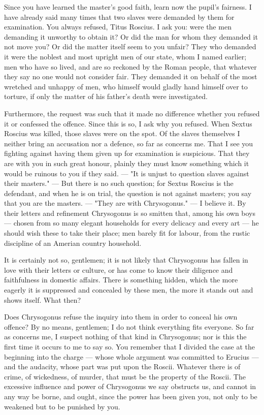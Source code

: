 Since you have learned the master's good faith, learn now the pupil's fairness. I have already said many times that two slaves were demanded by them for examination. You always refused, Titus Roscius. I ask you: were the men demanding it unworthy to obtain it? Or did the man for whom they demanded it not move you? Or did the matter itself seem to you unfair? They who demanded it were the noblest and most upright men of our state, whom I named earlier; men who have so lived, and are so reckoned by the Roman people, that whatever they say no one would not consider fair. They demanded it on behalf of the most wretched and unhappy of men, who himself would gladly hand himself over to torture, if only the matter of his father's death were investigated.

 Furthermore, the request was such that it made no difference whether you refused it or confessed the offence. Since this is so, I ask why you refused. When Sextus Roscius was killed, those slaves were on the spot. Of the slaves themselves I neither bring an accusation nor a defence, so far as concerns me. That I see you fighting against having them given up for examination is suspicious. That they are with you in such great honour, plainly they must know something which it would be ruinous to you if they said. --- "It is unjust to question slaves against their masters." --- But there is no such question; for Sextus Roscius is the defendant, and when he is on trial, the question is not against masters; you say that you are the masters. --- "They are with Chrysogonus." --- I believe it. By their letters and refinement Chrysogonus is so smitten that, among his own boys --- chosen from so many elegant households for every delicacy and every art --- he should wish these to take their place; men barely fit for labour, from the rustic discipline of an Amerian country household.

 It is certainly not so, gentlemen; it is not likely that Chrysogonus has fallen in love with their letters or culture, or has come to know their diligence and faithfulness in domestic affairs. There is something hidden, which the more eagerly it is suppressed and concealed by these men, the more it stands out and shows itself. What then?

 Does Chrysogonus refuse the inquiry into them in order to conceal his own offence? By no means, gentlemen; I do not think everything fits everyone. So far as concerns me, I suspect nothing of that kind in Chrysogonus; nor is this the first time it occurs to me to say so. You remember that I divided the case at the beginning into the charge --- whose whole argument was committed to Erucius --- and the audacity, whose part was put upon the Roscii. Whatever there is of crime, of wickedness, of murder, that must be the property of the Roscii. The excessive influence and power of Chrysogonus we say obstructs us, and cannot in any way be borne, and ought, since the power has been given you, not only to be weakened but to be punished by you.

